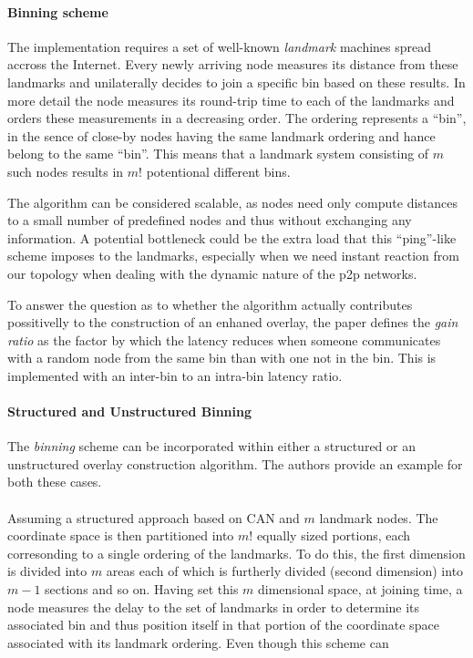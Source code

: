 \documentclass[a4paper,10pt]{article}
\begin{document}
\paragraph{Binning scheme}
The implementation requires a set of well-known \emph{landmark} machines spread accross the Internet. Every newly arriving node measures its distance from these landmarks and unilaterally decides to join a specific bin based on these results. In more detail the node measures its round-trip time to each of the landmarks and orders these measurements in a decreasing order. The ordering represents a ``bin'', in the sence of close-by nodes having the same landmark ordering and hance belong to the same ``bin''. This means that a landmark system consisting of $m$ such nodes results in $m!$ potentional different bins.

The algorithm can be considered scalable, as nodes need only compute distances to a small number of predefined nodes and thus without exchanging any information. A potential bottleneck could be the extra load that this ``ping''-like scheme imposes to the landmarks, especially when we need instant reaction from our topology when dealing with the dynamic nature of the p2p networks.

To answer the question as to whether the algorithm actually contributes possitivelly to the construction of an enhaned overlay, the paper defines the \emph{gain ratio} as the factor by which the latency reduces when someone communicates with a random node from the same bin than with one not in the bin. This is implemented with an inter-bin to an intra-bin latency ratio.

\paragraph{Structured and Unstructured Binning}
The \emph{binning} scheme can be incorporated within either a structured or an unstructured overlay construction algorithm. The authors provide an example for both these cases.

\paragraph{}
Assuming a structured approach based on CAN\cite{ratnasamy_can_2001} and $m$ landmark nodes. The coordinate space is then partitioned into $m!$ equally sized portions, each corresonding to a single ordering of the landmarks. To do this, the first dimension is divided into $m$ areas each of which is furtherly divided (second dimension) into $m - 1$ sections and so on. Having set this $m$ dimensional space, at joining time, a node measures the delay to the set of landmarks in order to determine its associated bin and thus position itself in that portion of the coordinate space associated with its landmark ordering. Even though this scheme can 
\end{document}
